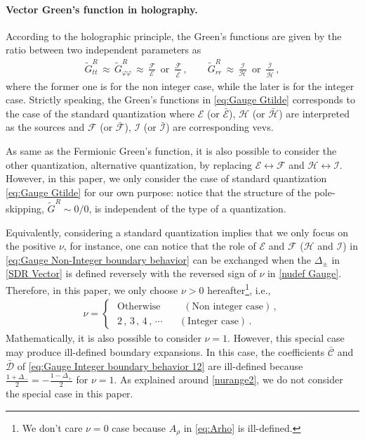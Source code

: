 \documentclass[11pt,a4paper]{article}
\begin{document}
\paragraph{Vector Green's function in holography.} According to the holographic principle, the Green's functions are given by the ratio between two independent parameters as
\begin{equation} \label{eq:Gauge Gtilde}
\begin{aligned}
    \tilde{G}^R_{tt} \,\approx\, \tilde{G}^R_{\varphi \varphi}  \,\approx\, \frac{\mathcal{F}}{\mathcal{E}} \,\,\, \text{or} \,\,\, \frac{\bar{\mathcal{F}}}{\bar{\mathcal{E}}}\,, \qquad
    \tilde{G}^R_{rr}  \,\approx\, \frac{\mathcal{I}}{\mathcal{H}} \,\,\, \text{or} \,\,\, \frac{\bar{\mathcal{I}}}{\bar{\mathcal{H}}}\,,
\end{aligned}
\end{equation}
where the former one is for the non integer case, while the later is for the integer case. Strictly speaking, the Green's functions in \eqref{eq:Gauge Gtilde} corresponds to the case of the standard quantization where $\mathcal{E}$ (or $\bar{\mathcal{E}}$), $\mathcal{H}$ (or $\bar{\mathcal{H}}$) are interpreted as the sources and $\mathcal{F}$ (or $\bar{\mathcal{F}}$), $\mathcal{I}$ (or $\bar{\mathcal{I}}$) are corresponding vevs.

As same as the Fermionic Green's function, it is also possible to consider the other quantization, alternative quantization, by replacing $\mathcal{E}\leftrightarrow \mathcal{F}$ and $\mathcal{H}\leftrightarrow \mathcal{I}$.
However, in this paper, we only consider the case of standard quantization \eqref{eq:Gauge Gtilde} for our own purpose: notice that the structure of the pole-skipping, $\tilde{G}^{R}\sim0/0$, is independent of the type of a quantization.

Equivalently, considering a standard quantization implies that we only focus on the positive $\nu$, for instance, one can notice that the role of $\mathcal{E}$ and $\mathcal{F}$ ($\mathcal{H}$ and $\mathcal{I}$) in \eqref{eq:Gauge Non-Integer boundary behavior} can be exchanged when the $\Delta_{\pm}$ in \eqref{SDR Vector} is defined reversely with the reversed sign of $\nu$ in \eqref{nudef Gauge}.
Therefore, in this paper, we only choose $\nu > 0$ hereafter\footnote{We don't care $\nu=0$ case because $A_{\rho}$ in \eqref{eq:Arho} is ill-defined.}, i.e.,
\begin{align}\label{nurange2 Vector}
\nu = 
\begin{cases}
       \,\, \textrm{Otherwise} \qquad\,\, (\textrm{Non integer case}) \,, \\
       \,\, 2\,,\, 3 \,,\, 4 \,,\, \cdots\,\,\,\, \quad (\textrm{Integer case}) \,.
\end{cases}
\end{align}
Mathematically, it is also possible to consider $\nu=1$. However, this special case may produce ill-defined boundary expansions. In this case, the coefficients $\bar{\mathcal{C}}$ and $\bar{\mathcal{D}}$ of \eqref{eq:Gauge Integer boundary behavior 12} are ill-defined because $\frac{1+\Delta_-}{2}=-\frac{1-\Delta_+}{2}$ for $\nu=1$. As explained around \eqref{nurange2}, we do not consider the special case in this paper.
\end{document}
